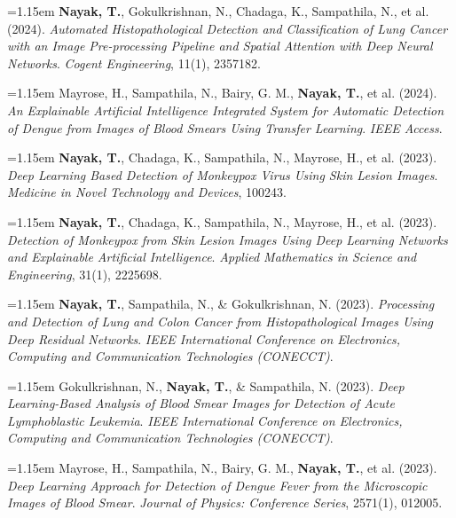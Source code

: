 \documentclass[letterpaper,10pt]{article}
\newlength{\pubgap}
\newcommand{\cvPub}[1]{%
  \needspace{2\baselineskip}%
  \begingroup\normalsize\hangindent=1.15em\hangafter=1\noindent #1\par\endgroup
  \vspace{\pubgap}%
}
\newcommand{\pubLabel}[1]{%
  \vspace{1pt}{\small\bfseries #1}\par\vspace{1pt}%
}
\begin{document}
\cvPub{
\textbf{Nayak, T.}, Gokulkrishnan, N., Chadaga, K.,
Sampathila, N., et al. (2024).
\textit{Automated Histopathological Detection and Classification
of Lung Cancer with an Image Pre-processing Pipeline and
Spatial Attention with Deep Neural Networks}.
\textit{Cogent Engineering}, 11(1), 2357182.
}

\cvPub{
Mayrose, H., Sampathila, N., Bairy, G. M.,
\textbf{Nayak, T.}, et al. (2024).
\textit{An Explainable Artificial Intelligence Integrated
System for Automatic Detection of Dengue from Images
of Blood Smears Using Transfer Learning}.
\textit{IEEE Access}.
}

\cvPub{
\textbf{Nayak, T.}, Chadaga, K., Sampathila, N.,
Mayrose, H., et al. (2023).
\textit{Deep Learning Based Detection of Monkeypox Virus
Using Skin Lesion Images}.
\textit{Medicine in Novel Technology and Devices}, 100243.
}

\cvPub{
\textbf{Nayak, T.}, Chadaga, K., Sampathila, N.,
Mayrose, H., et al. (2023).
\textit{Detection of Monkeypox from Skin Lesion Images
Using Deep Learning Networks and Explainable
Artificial Intelligence}.
\textit{Applied Mathematics in Science and Engineering},
31(1), 2225698.
}




\pubLabel{Peer-reviewed Conference Publications}

\cvPub{
\textbf{Nayak, T.}, Sampathila, N.,
\& Gokulkrishnan, N. (2023).
\textit{Processing and Detection of Lung and Colon Cancer
from Histopathological Images Using Deep Residual Networks}.
\textit{IEEE International Conference on Electronics,
Computing and Communication Technologies (CONECCT)}.
}

\cvPub{
Gokulkrishnan, N., \textbf{Nayak, T.},
\& Sampathila, N. (2023).
\textit{Deep Learning-Based Analysis of Blood Smear Images
for Detection of Acute Lymphoblastic Leukemia}.
\textit{IEEE International Conference on Electronics,
Computing and Communication Technologies (CONECCT)}.
}

\cvPub{
Mayrose, H., Sampathila, N., Bairy, G. M.,
\textbf{Nayak, T.}, et al. (2023).
\textit{Deep Learning Approach for Detection of Dengue
Fever from the Microscopic Images of Blood Smear}.
\textit{Journal of Physics: Conference Series},
2571(1), 012005.
}


\pubLabel{Presentations}
\end{document}
